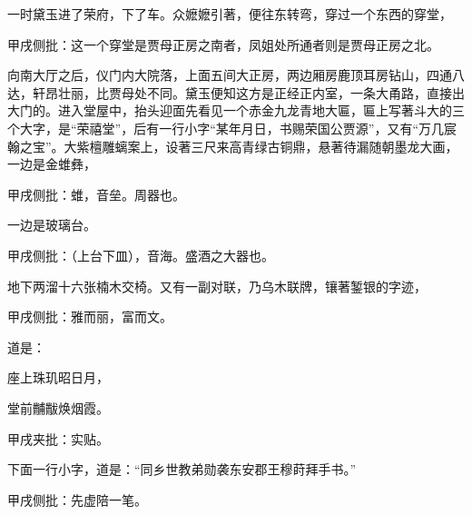 \begin{parag}
    一时黛玉进了荣府，下了车。众嬷嬷引著，便往东转弯，穿过一个东西的穿堂，\begin{note}甲戌侧批：这一个穿堂是贾母正房之南者，凤姐处所通者则是贾母正房之北。\end{note}向南大厅之后，仪门内大院落，上面五间大正房，两边厢房鹿顶耳房钻山，四通八达，轩昂壮丽，比贾母处不同。黛玉便知这方是正经正内室，一条大甬路，直接出大门的。进入堂屋中，抬头迎面先看见一个赤金九龙青地大匾，匾上写著斗大的三个大字，是“荣禧堂”，后有一行小字“某年月日，书赐荣国公贾源”，又有“万几宸翰之宝”。大紫檀雕螭案上，设著三尺来高青绿古铜鼎，悬著待漏随朝墨龙大画，一边是金蜼彝，\begin{note}甲戌侧批：蜼，音垒。周器也。\end{note}一边是玻璃台。\begin{note}甲戌侧批：（上台下皿），音海。盛酒之大器也。\end{note}地下两溜十六张楠木交椅。又有一副对联，乃乌木联牌，镶著錾银的字迹，\begin{note}甲戌侧批：雅而丽，富而文。\end{note}道是：
\end{parag}
\begin{poem}
    \begin{pl} 座上珠玑昭日月， \end{pl}

    \begin{pl}堂前黼黻焕烟霞。\end{pl}\begin{note}甲戌夹批：实贴。\end{note}
\end{poem}


\begin{parag}
    下面一行小字，道是：“同乡世教弟勋袭东安郡王穆莳拜手书。”\begin{note}甲戌侧批：先虚陪一笔。\end{note}
\end{parag}



